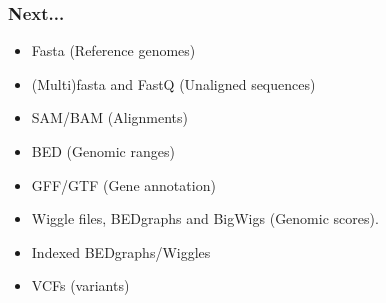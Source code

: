 \documentclass{beamer}
\begin{document}
\begin{frame}
  \frametitle{Next...}
  \begin{itemize}

  \item Fasta (Reference genomes)

  \item (Multi)fasta and FastQ (Unaligned sequences)
 
  \item SAM/BAM (Alignments)
 
  \item BED (Genomic ranges)
 
  \item GFF/GTF (Gene annotation)
 
  \item Wiggle files, BEDgraphs and BigWigs (Genomic scores).
 
  \item Indexed BEDgraphs/Wiggles

  \item VCFs (variants)

  \end{itemize}
\end{frame}
\end{document}
